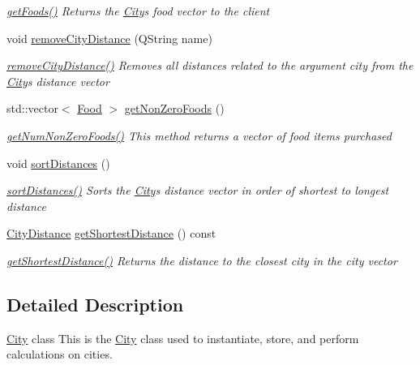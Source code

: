 \begin{DoxyCompactItemize}
\begin{DoxyCompactList}\small\item\em \mbox{\hyperlink{class_city_a16bcefb0db18d8692df25626542524f9}{get\+Foods()}} Returns the \mbox{\hyperlink{class_city}{City}}\textquotesingle{}s food vector to the client \end{DoxyCompactList}\item 
void \mbox{\hyperlink{class_city_ac4829f9fc09b4c0f4cf2f7453c974264}{remove\+City\+Distance}} (Q\+String name)
\begin{DoxyCompactList}\small\item\em \mbox{\hyperlink{class_city_ac4829f9fc09b4c0f4cf2f7453c974264}{remove\+City\+Distance()}} Removes all distances related to the argument city from the \mbox{\hyperlink{class_city}{City}}\textquotesingle{}s distance vector \end{DoxyCompactList}\item 
std\+::vector$<$ \mbox{\hyperlink{class_food}{Food}} $>$ \mbox{\hyperlink{class_city_a9fd728158f1704d4dc8fc37b7ed7230c}{get\+Non\+Zero\+Foods}} ()
\begin{DoxyCompactList}\small\item\em \mbox{\hyperlink{class_city_adc2840394de55c7fa19a0411d7b7541d}{get\+Num\+Non\+Zero\+Foods()}} This method returns a vector of food items purchased \end{DoxyCompactList}\item 
void \mbox{\hyperlink{class_city_a9e3da459f9dcf61ae1a4551d79abafb8}{sort\+Distances}} ()
\begin{DoxyCompactList}\small\item\em \mbox{\hyperlink{class_city_a9e3da459f9dcf61ae1a4551d79abafb8}{sort\+Distances()}} Sorts the \mbox{\hyperlink{class_city}{City}}\textquotesingle{}s distance vector in order of shortest to longest distance \end{DoxyCompactList}\item 
\mbox{\hyperlink{struct_city_distance}{City\+Distance}} \mbox{\hyperlink{class_city_ad577ecd4be83b37ef2f9c5ff547f5259}{get\+Shortest\+Distance}} () const
\begin{DoxyCompactList}\small\item\em \mbox{\hyperlink{class_city_ad577ecd4be83b37ef2f9c5ff547f5259}{get\+Shortest\+Distance()}} Returns the distance to the closest city in the city vector \end{DoxyCompactList}\end{DoxyCompactItemize}


\subsection{Detailed Description}
\mbox{\hyperlink{class_city}{City}} class This is the \mbox{\hyperlink{class_city}{City}} class used to instantiate, store, and perform calculations on cities. 

